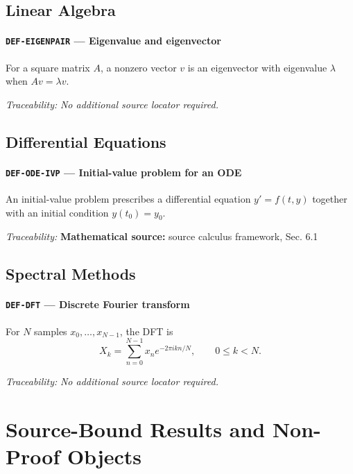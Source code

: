 \documentclass[10pt]{article}
\newcommand{\pidraw}[1]{\begingroup\urlstyle{tt}\nolinkurl{#1}\endgroup}
\theoremstyle{definition}
\theoremstyle{remark}
\begin{document}
\subsection{Linear Algebra}

\label{prf:DEF-EIGENPAIR}

\paragraph{\pidraw{DEF-EIGENPAIR} --- Eigenvalue and eigenvector}

For a square matrix $A$, a nonzero vector $v$ is an eigenvector with eigenvalue $\lambda$ when $Av=\lambda v$.

\smallskip\noindent\textit{Traceability:} \emph{No additional source locator required.}\par

\subsection{Differential Equations}

\label{prf:DEF-ODE-IVP}

\paragraph{\pidraw{DEF-ODE-IVP} --- Initial-value problem for an ODE}

An initial-value problem prescribes a differential equation $y'=f(t,y)$ together with an initial condition $y(t_0)=y_0$.

\smallskip\noindent\textit{Traceability:} \textbf{Mathematical source:} source calculus framework, Sec. 6.1\par

\subsection{Spectral Methods}

\label{prf:DEF-DFT}

\paragraph{\pidraw{DEF-DFT} --- Discrete Fourier transform}

For $N$ samples $x_0,\ldots,x_{N-1}$, the DFT is
 \[
 X_k=\sum_{n=0}^{N-1}x_n e^{-2\pi i kn/N},\qquad 0\le k<N.
 \]

\smallskip\noindent\textit{Traceability:} \emph{No additional source locator required.}\par\section{Source-Bound Results and Non-Proof Objects}
\end{document}
